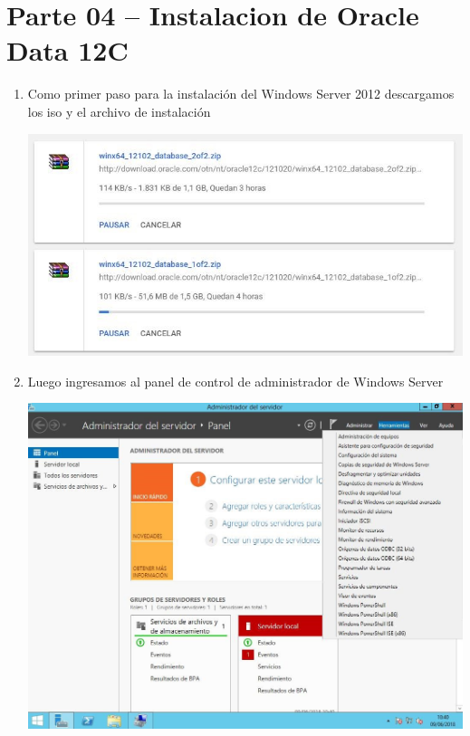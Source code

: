 \section{Parte 04 – Instalacion de Oracle Data 12C} 

\begin{enumerate}[1.]
	\item Como primer paso para la instalaci\'on del Windows Server 2012 descargamos los iso y el archivo de instalaci\'on\\
	\begin{center}
	\includegraphics[width=15cm]{./Imagenes/img1} 
	\end{center}

	\item Luego ingresamos al panel de control de administrador de Windows Server\\
	\begin{center}
	\includegraphics[width=15cm]{./Imagenes/img2} 
	\end{center}



\end{enumerate}
